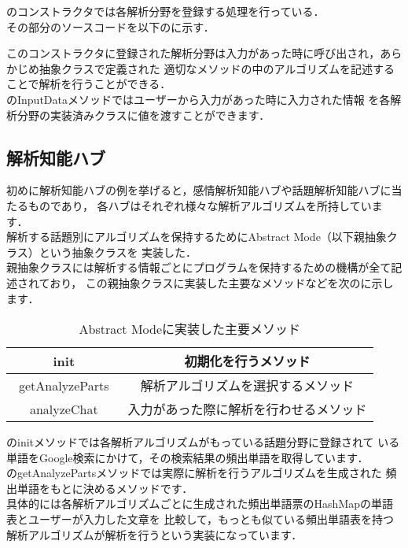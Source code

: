 のコンストラクタでは各解析分野を登録する処理を行っている．\\
その部分のソースコードを以下のに示す．


このコンストラクタに登録された解析分野は入力があった時に呼び出され，あらかじめ抽象クラスで定義された
適切なメソッドの中のアルゴリズムを記述することで解析を行うことができる．
\\


のInputDataメソッドではユーザーから入力があった時に入力された情報
を各解析分野の実装済みクラスに値を渡すことができます．\\


\subsection{解析知能ハブ}
初めに解析知能ハブの例を挙げると，感情解析知能ハブや話題解析知能ハブに当たるものであり，
各ハブはそれぞれ様々な解析アルゴリズムを所持しています．\\

解析する話題別にアルゴリズムを保持するためにAbstract Mode（以下親抽象クラス）という抽象クラスを
実装した．\\

親抽象クラスには解析する情報ごとにプログラムを保持するための機構が全て記述されており，
この親抽象クラスに実装した主要なメソッドなどを次のに示します．

\begin{table}[tbh]
	\caption{Abstract Modeに実装した主要メソッド} \label{tab:Abstract Mode}
	\begin{center}
		\begin{tabular}[htb]{c|c}
		\hline
		init & 初期化を行うメソッド \\ \hline
		getAnalyzeParts　& 解析アルゴリズムを選択するメソッド \\ \hline
		analyzeChat & 入力があった際に解析を行わせるメソッド \\ \hline
		\end{tabular}
	\end{center}
\end{table}


のinitメソッドでは各解析アルゴリズムがもっている話題分野に登録されて
いる単語をGoogle検索にかけて，その検索結果の頻出単語を取得しています．
\\
のgetAnalyzePartsメソッドでは実際に解析を行うアルゴリズムを生成された
頻出単語をもとに決めるメソッドです．
\\
具体的には各解析アルゴリズムごとに生成された頻出単語票のHashMapの単語表とユーザーが入力した文章を
比較して，もっとも似ている頻出単語表を持つ解析アルゴリズムが解析を行うという実装になっています．
\\



